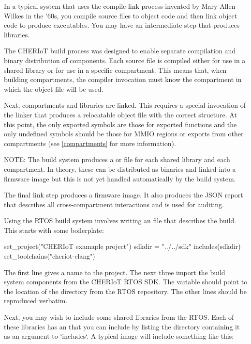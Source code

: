 In a typical system that uses the compile-link process invented by Mary Allen Wilkes in the '60s, you compile source files to object code and then link object code to produce executables.
You may have an intermediate step that produces libraries.

The CHERIoT build process was designed to enable separate compilation and binary distribution of components.
Each source file is compiled either for use in a shared library or for use in a specific compartment.
This means that, when building compartments, the compiler invocation must know the compartment in which the object file will be used.

Next, compartments and libraries are linked.
This requires a special invocation of the linker that produces a relocatable object file with the correct structure.
At this point, the only exported symbols are those for exported functions and the only undefined symbols should be those for MMIO regions or exports from other compartments (see \ref{compartments} for more information).

NOTE: The build system produces a  or  file for each shared library and each compartment.
In theory, these can be distributed as binaries and linked into a firmware image but this is not yet handled automatically by the build system.

The final link step produces a firmware image.
It also produces the JSON report that describes all cross-compartment interactions and is used for auditing.

Using the RTOS build system involves writing an  file that describes the build.
This starts with some boilerplate:

\begin{luasnippet}
set_project("CHERIoT examaple project")
sdkdir = "../../sdk"
includes(sdkdir)
set_toolchains("cheriot-clang")
\end{luasnippet}

The first line gives a name to the project.
The next three import the build system components from the CHERIoT RTOS SDK.
The  variable should point to the location of the  directory from the RTOS repository.
The other lines should be reproduced verbatim.

Next, you may wish to include some shared libraries from the RTOS.
Each of these libraries has an  that you can include by listing the directory containing it as an argument to `includes`.
A typical image will include something like this:


